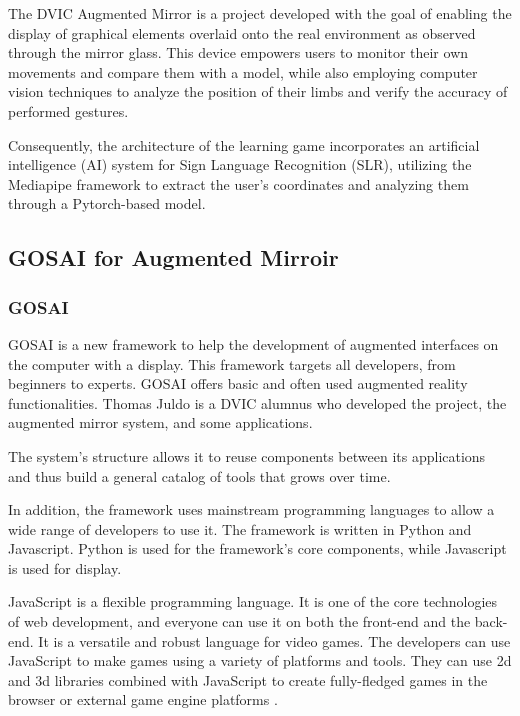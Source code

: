 The DVIC Augmented Mirror is a project developed with the goal of enabling the display of graphical elements overlaid onto the real environment as observed through the mirror glass. This device empowers users to monitor their own movements and compare them with a model, while also employing computer vision techniques to analyze the position of their limbs and verify the accuracy of performed gestures.

Consequently, the architecture of the learning game incorporates an artificial intelligence (AI) system for Sign Language Recognition (SLR), utilizing the Mediapipe framework to extract the user's coordinates and analyzing them through a Pytorch-based model.

\subsection{GOSAI for Augmented Mirroir}

\subsubsection{GOSAI}

GOSAI \cite{gosai} is a new framework to help the development of augmented interfaces on the computer with a display. This framework targets all developers, from beginners to experts. GOSAI offers
basic and often used augmented reality functionalities. Thomas Juldo is a DVIC alumnus who developed the project, the augmented mirror system, and some applications. 

The system's structure allows it to reuse components between its applications and thus build a general catalog of tools that grows over time.

In addition, the framework uses mainstream programming languages to allow a wide range of developers to
use it. The framework is written in Python and Javascript.
Python is used for the framework's core components,
while Javascript is used for display.

JavaScript is a flexible programming language. It is one of the core
technologies of web development, and everyone can use it on both the
front-end and the back-end.
It is a versatile and robust language for video games. The developers can use JavaScript to make games using a variety of platforms and tools. They can use 2d and 3d libraries combined with JavaScript to create fully-fledged games in the browser or external game engine platforms \cite{javascriptgaming}.

